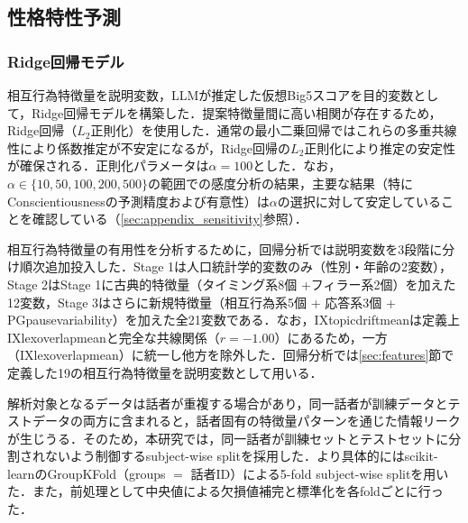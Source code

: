 \documentclass[dvipdfmx,11pt,a4paper]{bxjsarticle}
\renewcommand{\_}{\paperorigunderscore\allowbreak}%
\begin{document}
\subsection{性格特性予測}
\label{sec:pred_personality}

\subsubsection{Ridge回帰モデル}

相互行為特徴量を説明変数，LLMが推定した仮想Big5スコアを目的変数として，Ridge回帰モデルを構築した．提案特徴量間に高い相関が存在するため，Ridge回帰（$L_2$正則化）を使用した．通常の最小二乗回帰ではこれらの多重共線性により係数推定が不安定になるが，Ridge回帰の$L_2$正則化により推定の安定性が確保される．正則化パラメータは$\alpha = 100$とした．なお，$\alpha \in \{10, 50, 100, 200, 500\}$の範囲での感度分析の結果，主要な結果（特にConscientiousnessの予測精度および有意性）は$\alpha$の選択に対して安定していることを確認している（\ref{sec:appendix_sensitivity}参照）．

相互行為特徴量の有用性を分析するために，回帰分析では説明変数を3段階に分け順次追加投入した．Stage 1は人口統計学的変数のみ（性別・年齢の2変数），Stage 2はStage 1に古典的特徴量（タイミング系8個 +フィラー系2個）を加えた12変数，Stage 3はさらに新規特徴量（相互行為系5個 + 応答系3個 + PG\_pause\_variability）を加えた全21変数である．なお，IX\_topic\_drift\_meanは定義上IX\_lex\_overlap\_meanと完全な共線関係（$r = -1.00$）にあるため，一方（IX\_lex\_overlap\_mean）に統一し他方を除外した．回帰分析では\ref{sec:features}節で定義した19の相互行為特徴量を説明変数として用いる．

解析対象となるデータは話者が重複する場合があり，同一話者が訓練データとテストデータの両方に含まれると，話者固有の特徴量パターンを通じた情報リークが生じうる．そのため，本研究では，同一話者が訓練セットとテストセットに分割されないよう制御するsubject-wise splitを採用した．より具体的にはscikit-learnのGroupKFold（groups $=$ 話者ID）による5-fold subject-wise splitを用いた．また，前処理として中央値による欠損値補完と標準化を各foldごとに行った．


\end{document}
